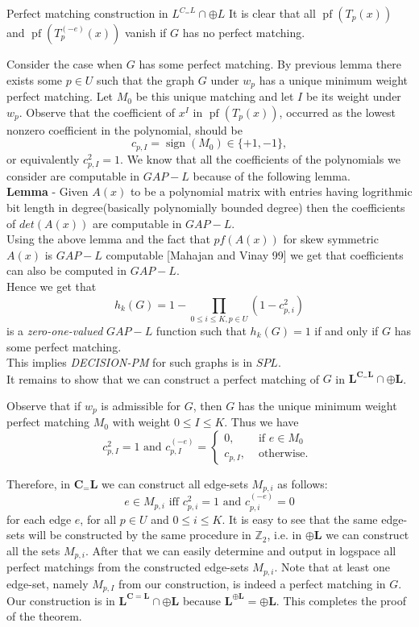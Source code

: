 \documentclass{beamer}
\begin{document}
\begin{frame}[allowframebreaks]{Perfect matching construction in $L^{C_=L} \cap \oplus L$}
	It is clear that all $\operatorname{pf}\left(T_p(x)\right)$ and $\operatorname{pf}\left(T_p^{(-e)}(x)\right)$ vanish if $G$ has no perfect matching.
	
	Consider the case when $G$ has some perfect matching. By previous lemma there exists some $p \in U$ such that the graph $G$ under $w_p$ has a unique minimum weight perfect matching. Let $M_0$ be this unique matching and let $I$ be its weight under $w_p$. Observe that the coefficient of $x^I$ in $\operatorname{pf}\left(T_p(x)\right)$, occurred as the lowest nonzero coefficient in the polynomial, should be
	$$
	c_{p, I}=\operatorname{sign}\left(M_0\right) \in\{+1,-1\},
	$$
	or equivalently $c_{p, I}^2=1$. We know that all the coefficients of the polynomials we consider are computable in $GAP-L$ because of the following lemma.\\
	\textbf{Lemma} - Given $A(x)$ to be a polynomial matrix with entries having logrithmic bit length in degree(basically polynomially bounded degree) then the coefficients of $det(A(x))$ are computable in $GAP-L$.
	\\
	Using the above lemma and the fact that $pf(A(x))$ for skew symmetric $A(x)$ is $GAP-L$ computable [Mahajan and Vinay 99] we get that coefficients can also be computed in $GAP-L$.\\
	 Hence we get that $$h_k(G)= 1 - \prod_{0\leq i \leq K, p \in U} (1-c^{2}_{p,i})$$
	is a \textit{zero-one-valued} $GAP-L$ function such that $h_k(G)=1$ if and only if $G$ has some perfect matching.\\
	This implies \textit{DECISION-PM} for such graphs is in $SPL$.\\
	It remains to show that we can construct a perfect matching of $G$ in $\mathbf{L}^{\mathbf{C}_{=} \mathbf{L}} \cap \oplus \mathbf{L}$.
	
	Observe that if $w_p$ is admissible for $G$, then $G$ has the unique minimum weight perfect matching $M_0$ with weight $0 \leq I \leq K$. Thus we have
	$$
	c_{p, I}^2=1 \text { and } c_{p, I}^{(-e)}=\left\{\begin{array}{cl}
		0, & \text { if } e \in M_0 \\
		c_{p, I}, & \text { otherwise. }
	\end{array}\right.
	$$
	
	Therefore, in $\mathbf{C}_{=} \mathbf{L}$ we can construct all edge-sets $M_{p, i}$ as follows:
	$$
	e \in M_{p, i} \text { iff } c_{p, i}^2=1 \text { and } c_{p, i}^{(-e)}=0
	$$
	for each edge $e$, for all $p \in U$ and $0 \leq i \leq K$.
	It is easy to see that the same edge-sets will be constructed by the same procedure in $\mathbb{Z}_2$, i.e. in $\oplus \mathbf{L}$ we can construct all the sets $M_{p, i}$. After that we can easily determine and output in logspace all perfect matchings from the constructed edge-sets $M_{p, i}$. Note that at least one edge-set, namely $M_{p, I}$ from our construction, is indeed a perfect matching in $G$. Our construction is in $\mathbf{L}^{\mathbf{C}=\mathbf{L}} \cap \oplus \mathbf{L}$ because $\mathbf{L}^{\oplus \mathbf{L}}=\oplus \mathbf{L}$. This completes the proof of the theorem.
	
\end{frame}
\end{document}

